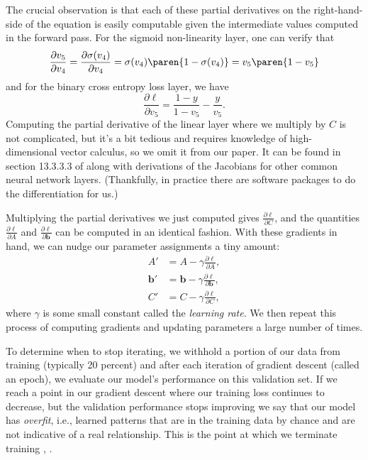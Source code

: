 The crucial observation is that each of these partial derivatives on the right-hand-side of the equation is easily computable given the intermediate values computed in the forward pass.
For the sigmoid non-linearity layer, one can verify that
\begin{equation}
	\frac{\partial v_5}{\partial v_4}
	= \frac{\partial \sigma(v_4)}{\partial v_4}
	= \sigma(v_4) \paren{1 - \sigma(v_4)}
	= v_5 \paren{1 - v_5}
\end{equation}
and for the binary cross entropy loss layer, we have
\begin{equation}
	\frac{\partial \ell}{\partial v_5} = \frac{1 - y}{1 - v_5} - \frac{y}{v_5}.
\end{equation}
Computing the partial derivative of the linear layer where we multiply by $C$ is not complicated, but it's a bit tedious and requires knowledge of high-dimensional vector calculus, so we omit it from our paper. It can be found in section 13.3.3.3 of \textcite{PML} along with derivations of the Jacobians for other common neural network layers. (Thankfully, in practice there are software packages to do the differentiation for us.)

Multiplying the partial derivatives we just computed gives $\frac{\partial \ell}{\partial C}$, and the quantities $\frac{\partial \ell}{\partial A}$ and $\frac{\partial \ell}{\partial \mathbf b}$ can be computed in an identical fashion. With these gradients in hand, we can nudge our parameter assignments a tiny amount:
\begin{equation}
	\begin{aligned}
		A'         & = A - \gamma \frac{\partial \ell}{\partial A},                 \\
		\mathbf b' & = \mathbf b - \gamma \frac{\partial \ell}{\partial \mathbf b}, \\
		C'         & = C - \gamma \frac{\partial \ell}{\partial C},
	\end{aligned}
\end{equation}
where $\gamma$ is some small constant called the \emph{learning rate}. We then repeat this process of computing gradients and updating parameters a large number of times.

To determine when to stop iterating, we withhold a portion of our data from training (typically 20 percent) and after each iteration of gradient descent (called an epoch), we evaluate our model's performance on this validation set.
If we reach a point in our gradient descent where our training loss continues to decrease, but the validation performance stops improving we say that our model has \emph{overfit}, i.e., learned patterns that are in the training data by chance and are not indicative of a real relationship.
This is the point at which we terminate training \cite[\S 10.7.2]{ISL}, \cite[\S 13.5.1]{PML}.

